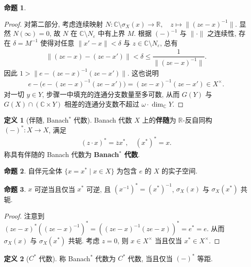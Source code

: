 \documentclass{MainStyle}
\theoremstyle{definition}
\theoremstyle{definition}
\theoremstyle{definition}
\newtheorem{definition}{定义}
\theoremstyle{definition}
\newtheorem{proposition}{命题}
\theoremstyle{definition}
\theoremstyle{definition}
\theoremstyle{definition}
\theoremstyle{remark}
\theoremstyle{remark}
\begin{document}
\begin{proposition}
\begin{proof}
        对第二部分, 考虑连续映射 $N:\mathbb C\setminus \sigma_X(x)\to \mathbb R, \quad z\mapsto \|(ze-x)^{-1}\|$. 显然 $N(\infty)=0$, 故 $N$ 在 $\mathbb C\setminus N_\varepsilon$ 中有上界 $M$. 根据 $(-)^{-1}$ 与 $\|\cdot\|$ 之连续性, 存在 $\delta =M^{-1}$ 使得对任意 $\|x'-x\|<\delta$ 与 $z\in \mathbb C\setminus N_\varepsilon$, 总有
        \begin{align*}
            \|(ze-x)-(ze-x')\|<\delta \leq \dfrac{1}{\|(ze-x)^{-1}\|}.
        \end{align*}
        因此 $1>\|e-(ze-x)^{-1}(ze-x')\|$. 这也说明
        \begin{align*}
            e-\Big(e-(ze-x)^{-1}(ze-x')\Big)=(ze-x)^{-1}(ze-x')\in X^\times.
        \end{align*}
        对一切 $y\in Y$, 步骤一中填充的连通分支数量至多可数, 从而 $G(Y)$ 与 $G(X)\cap (\mathbb C\times Y)$ 相差的连通分支数不超过 $\omega \cdot \dim_{\mathbb C}Y$.
    \end{proof}
\end{proposition}

\begin{definition}[伴随, Banach$^\ast$ 代数]
    Banach 代数 $X$ 上的\textbf{伴随}为 $\mathbb R$-反自同构 $(-)^\ast:X\to X$, 满足
    \begin{align*}
        (z\cdot x)^\ast=\overline z x^\ast,\quad (x^\ast)^\ast=x.
    \end{align*}
    称具有伴随的 Banach 代数为 \textbf{Banach$^\ast$ 代数}.
\end{definition}

\begin{proposition}
    自伴元全体 $\{x=x^\ast\mid x\in X\}$ 为包含 $e$ 的 $X$ 的实子空间.
\end{proposition}

\begin{proposition}
    $x$ 可逆当且仅当 $x^\ast$ 可逆, 且 $(x^{-1})^\ast=(x^\ast)^{-1}$, $\sigma_X(x)$ 与 $\sigma_X(x^\ast)$ 共轭.
    \begin{proof}
        注意到 $(ze-x)^\ast ((ze-x)^{-1})^\ast=((ze-x)^{-1}(ze-x))^\ast=e^\ast=e$. 从而 $\sigma_X(x)$ 与 $\sigma_X(x^\ast)$ 共轭. 考虑 $z=0$, 则 $x\in X^\times$ 当且仅当 $x^\ast \in X^\times$.
    \end{proof}
\end{proposition}

\begin{definition}[$C^\ast$ 代数]
    称 Banach$^\ast$ 代数为 $C^\ast$ 代数, 当且仅当 $(-)^\ast$ 等距.
\end{definition}
\end{document}
